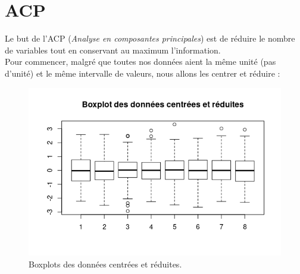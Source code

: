 \documentclass[11pt]{article}
\begin{document}
\section{ACP}
Le but de l'ACP (\emph{Analyse en composantes principales}) est de réduire le nombre de variables tout en conservant au maximum l'information.\\
Pour commencer, malgré que toutes nos données aient la même unité (pas d'unité) et le même intervalle de valeurs, nous allons les centrer et réduire :
\begin{figure}[H]
\centering
\includegraphics[scale=1]{boxplotCR.png}
\caption{Boxplots des données centrées et réduites.}
\end{figure}
\end{document}
